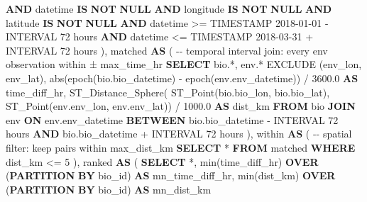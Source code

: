 \documentclass[
  letterpaper,
  DIV=11,
  numbers=noendperiod]{scrreprt}
\newenvironment{Shaded}{\begin{snugshade}}{\end{snugshade}}
\newcommand{\CommentTok}[1]{\textcolor[rgb]{0.37,0.37,0.37}{#1}}
\newcommand{\DataTypeTok}[1]{\textcolor[rgb]{0.68,0.00,0.00}{#1}}
\newcommand{\DecValTok}[1]{\textcolor[rgb]{0.68,0.00,0.00}{#1}}
\newcommand{\FloatTok}[1]{\textcolor[rgb]{0.68,0.00,0.00}{#1}}
\newcommand{\FunctionTok}[1]{\textcolor[rgb]{0.28,0.35,0.67}{#1}}
\newcommand{\KeywordTok}[1]{\textcolor[rgb]{0.00,0.23,0.31}{\textbf{#1}}}
\newcommand{\NormalTok}[1]{\textcolor[rgb]{0.00,0.23,0.31}{#1}}
\newcommand{\OperatorTok}[1]{\textcolor[rgb]{0.37,0.37,0.37}{#1}}
\newcommand{\StringTok}[1]{\textcolor[rgb]{0.13,0.47,0.30}{#1}}
\begin{document}
\begin{Shaded}
\begin{Highlighting}[]
    \KeywordTok{AND}\NormalTok{ datetime }\KeywordTok{IS} \KeywordTok{NOT} \KeywordTok{NULL}
    \KeywordTok{AND}\NormalTok{ longitude }\KeywordTok{IS} \KeywordTok{NOT} \KeywordTok{NULL}
    \KeywordTok{AND}\NormalTok{ latitude }\KeywordTok{IS} \KeywordTok{NOT} \KeywordTok{NULL}
    \KeywordTok{AND}\NormalTok{ datetime }\OperatorTok{\textgreater{}=} \DataTypeTok{TIMESTAMP} \StringTok{\textquotesingle{}2018{-}01{-}01\textquotesingle{}} \OperatorTok{{-}} \DataTypeTok{INTERVAL} \StringTok{\textquotesingle{}72 hours\textquotesingle{}}
    \KeywordTok{AND}\NormalTok{ datetime }\OperatorTok{\textless{}=} \DataTypeTok{TIMESTAMP} \StringTok{\textquotesingle{}2018{-}03{-}31\textquotesingle{}} \OperatorTok{+} \DataTypeTok{INTERVAL} \StringTok{\textquotesingle{}72 hours\textquotesingle{}}
\NormalTok{),}
\NormalTok{matched }\KeywordTok{AS}\NormalTok{ (}
  \CommentTok{{-}{-} temporal interval join: every env observation within ± max\_time\_hr}
  \KeywordTok{SELECT}
\NormalTok{    bio.}\OperatorTok{*}\NormalTok{,}
\NormalTok{    env.}\OperatorTok{*}\NormalTok{ EXCLUDE (env\_lon, env\_lat),}
    \FunctionTok{abs}\NormalTok{(epoch(bio.bio\_datetime) }\OperatorTok{{-}}\NormalTok{ epoch(env.env\_datetime)) }\OperatorTok{/} \FloatTok{3600.0} \KeywordTok{AS}\NormalTok{ time\_diff\_hr,}
\NormalTok{    ST\_Distance\_Sphere(}
\NormalTok{      ST\_Point(bio.bio\_lon, bio.bio\_lat),}
\NormalTok{      ST\_Point(env.env\_lon, env.env\_lat)) }\OperatorTok{/} \FloatTok{1000.0}                  \KeywordTok{AS}\NormalTok{ dist\_km}
  \KeywordTok{FROM}\NormalTok{ bio}
  \KeywordTok{JOIN}\NormalTok{ env}
    \KeywordTok{ON}\NormalTok{ env.env\_datetime }\KeywordTok{BETWEEN}\NormalTok{ bio.bio\_datetime }\OperatorTok{{-}} \DataTypeTok{INTERVAL} \StringTok{\textquotesingle{}72 hours\textquotesingle{}}
                            \KeywordTok{AND}\NormalTok{ bio.bio\_datetime }\OperatorTok{+} \DataTypeTok{INTERVAL} \StringTok{\textquotesingle{}72 hours\textquotesingle{}}
\NormalTok{),}
\NormalTok{within }\KeywordTok{AS}\NormalTok{ (}
  \CommentTok{{-}{-} spatial filter: keep pairs within max\_dist\_km}
  \KeywordTok{SELECT} \OperatorTok{*} \KeywordTok{FROM}\NormalTok{ matched}
  \KeywordTok{WHERE}\NormalTok{ dist\_km }\OperatorTok{\textless{}=} \DecValTok{5}
\NormalTok{),}
\NormalTok{ranked }\KeywordTok{AS}\NormalTok{ (}
  \KeywordTok{SELECT}
    \OperatorTok{*}\NormalTok{,}
    \FunctionTok{min}\NormalTok{(time\_diff\_hr) }\KeywordTok{OVER}\NormalTok{ (}\KeywordTok{PARTITION} \KeywordTok{BY}\NormalTok{ bio\_id) }\KeywordTok{AS}\NormalTok{ mn\_time\_diff\_hr,}
    \FunctionTok{min}\NormalTok{(dist\_km)      }\KeywordTok{OVER}\NormalTok{ (}\KeywordTok{PARTITION} \KeywordTok{BY}\NormalTok{ bio\_id) }\KeywordTok{AS}\NormalTok{ mn\_dist\_km}

\end{Highlighting}
\end{Shaded}
\end{document}
